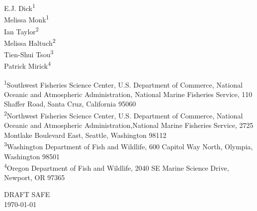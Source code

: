 
\begin{center}
\thispagestyle{empty}






E.J. Dick\textsuperscript{1}\\
Melissa Monk\textsuperscript{1}\\
Ian Taylor\textsuperscript{2}\\
Melissa Haltuch\textsuperscript{2}\\
Tien-Shui Tsou\textsuperscript{3}\\
Patrick Mirick\textsuperscript{4}\\

\vspace{.2cm}

\small
\textsuperscript{1}Southwest Fisheries Science Center, U.S. Department of Commerce, National Oceanic and Atmospheric Administration, National Marine Fisheries Service, 110 Shaffer Road, Santa Cruz, California 95060\\

\textsuperscript{2}Northwest Fisheries Science Center, U.S. Department of Commerce, National Oceanic and Atmospheric Administration,National Marine Fisheries Service, 2725 Montlake Boulevard East, Seattle, Washington 98112\\

\textsuperscript{3}Washington Department of Fish and Wildlife, 600 Capitol Way North, Olympia, Washington 98501\\

\textsuperscript{4}Oregon Department of Fish and Wildlife, 2040 SE Marine Science Drive, Newport, OR 97365\\


\vspace{.2cm}

\vfill
DRAFT SAFE\\

{\large \today}

\maketitle

\setcounter{page}{1}
\end{center}



